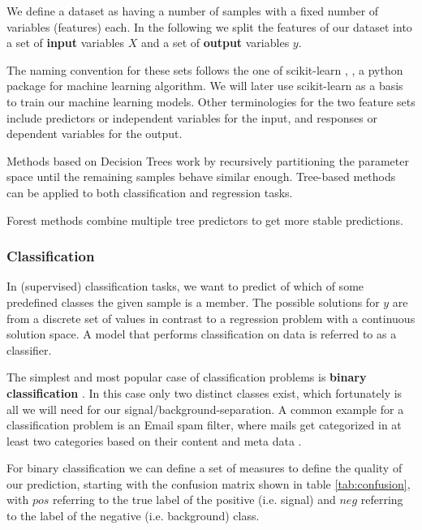 We define a dataset as having a number of samples with a fixed number of
variables (features) each.
In the following we split
the features of our dataset into a set of \textbf{input} variables $X$ and
a set of \textbf{output} variables $y$.

The naming convention for
these sets follows the one of scikit-learn
\cite{scikit-learn}, \cite{sklearn_api}, a python package for
machine learning algorithm.
We will later use scikit-learn as a basis to train our machine learning models.
Other terminologies for the two feature sets include
predictors or independent variables for the input, and
responses or dependent variables for the output.

Methods based on Decision Trees work by recursively partitioning
the parameter space until the remaining samples behave similar enough.
Tree-based methods can be applied to both classification and regression tasks.

Forest methods combine multiple tree predictors to get more stable
predictions.

\subsubsection{Classification}
In (supervised) classification tasks, we want to predict of which of some
predefined classes the given sample is a member. The possible solutions for $y$
are from a discrete set of values in
contrast to a regression problem with a continuous solution space.
A model that performs classification on data is referred to as a
classifier.

The simplest and most popular case of classification problems
is \textbf{binary classification} \cite{sokolova2009systematic}.
In this case only two distinct
classes exist, which fortunately is all we will need for
our signal/background-separation.
A common example for a classification problem is an Email spam filter,
where mails get categorized in at least two categories based
on their content and meta data \cite{DBLP:journals/corr/cs-CL-0006013}.

For binary classification we can define a set of measures
to define the quality of our prediction, starting with the confusion matrix
shown in table \ref{tab:confusion},
with $pos$ referring to the true label of the positive (i.e. signal)
and $neg$ referring to the label of the negative (i.e. background) class.


